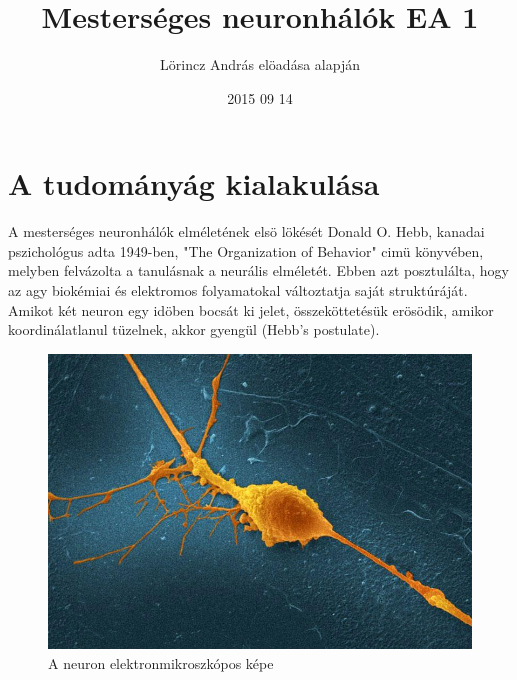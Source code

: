 \documentclass{article}
\title{Mesterséges neuronhálók EA 1}
\author{Lörincz András elöadása alapján}
\date{2015 09 14}
\begin{document}
\maketitle

\section{A tudományág kialakulása}
A mesterséges neuronhálók elméletének elsö lökését Donald O. Hebb, kanadai pszichológus adta 1949-ben, "The Organization of Behavior" cimü könyvében, melyben felvázolta a tanulásnak a neurális elméletét. Ebben azt posztulálta, hogy az agy biokémiai és elektromos folyamatokal változtatja saját struktúráját. Amikot két neuron egy idöben bocsát ki jelet, összeköttetésük erösödik, amikor koordinálatlanul tüzelnek, akkor gyengül (Hebb's postulate). \newline

\begin{figure}[h!]
\centering
\includegraphics[width=\textwidth,height=\textheight,keepaspectratio]{realneuron.jpg}
\caption{A neuron elektronmikroszkópos képe}
\label{fig:realneuron}
\end{figure}
\end{document}
